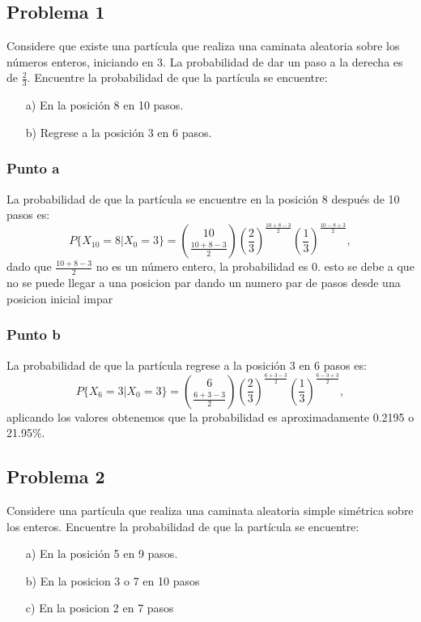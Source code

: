 \documentclass{article}
\begin{document}
\subsection*{Problema 1}

Considere que existe una partícula que realiza una caminata aleatoria sobre los números enteros, iniciando en 3. La probabilidad de dar un paso a la derecha es de \( \frac{2}{3} \). Encuentre la probabilidad de que la partícula se encuentre:

\begin{enumerate}
    \item[a)] En la posición 8 en 10 pasos.
    \item[b)] Regrese a la posición 3 en 6 pasos.
\end{enumerate}

\subsubsection*{Punto a}

La probabilidad de que la partícula se encuentre en la posición 8 después de 10 pasos es:
\[
    P\{X_{10} = 8 | X_0 = 3\} = \binom{10}{\frac{10 + 8 - 3}{2}} \left(\frac{2}{3}\right)^{\frac{10 + 8 - 3}{2}} \left(\frac{1}{3}\right)^{\frac{10 - 8 + 3}{2}},
\]
dado que \( \frac{10 + 8 - 3}{2} \) no es un número entero, la probabilidad es 0. esto se debe a que no se puede llegar a una posicion par dando un numero par de pasos desde una posicion inicial impar

\subsubsection*{Punto b}

La probabilidad de que la partícula regrese a la posición 3 en 6 pasos es:
\[
    P\{X_6 = 3 | X_0 = 3\} = \binom{6}{\frac{6 + 3 - 3}{2}} \left(\frac{2}{3}\right)^{\frac{6 + 3 - 3}{2}} \left(\frac{1}{3}\right)^{\frac{6 - 3 + 3}{2}},
\]
aplicando los valores obtenemos que la probabilidad es aproximadamente 0.2195 o 21.95\%.

\subsection*{Problema 2}

Considere una partícula que realiza una caminata aleatoria simple simétrica sobre los enteros. Encuentre la probabilidad de que la partícula se encuentre:

\begin{enumerate}
    \item[a)] En la posición 5 en 9 pasos.
    \item[b)] En la posicion 3 o 7 en 10 pasos
    \item[c)] En la posicion 2 en 7 pasos
\end{enumerate}
\end{document}
